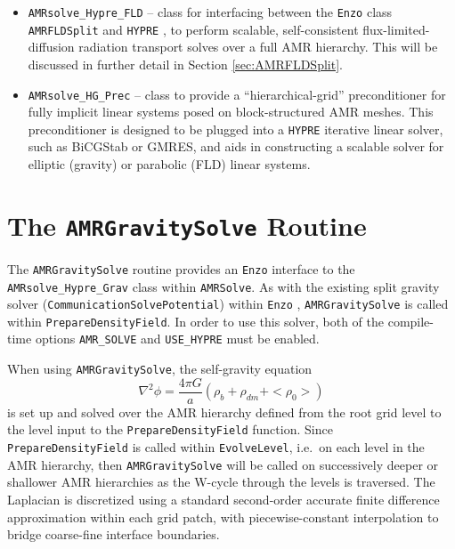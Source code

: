 \documentclass[letterpaper,10pt]{article}
\renewcommand{\(}{\left(}
\renewcommand{\)}{\right)}
\newcommand{\enzo}{{\tt Enzo} }
\newcommand{\hypre}{{\tt HYPRE} }
\begin{document}
\begin{itemize}
  \enzo routine {\tt AMRGravitySolve} and \hypre, to perform scalable,
  self-consistent self-gravity solves over a full AMR hierarchy.  This
  will be discussed in further detail in Section
  \ref{sec:AMRGravitySolve}.
\item {\tt AMRsolve\_Hypre\_FLD} -- class for interfacing between the
  \enzo class {\tt AMRFLDSplit} and \hypre, to perform scalable,
  self-consistent flux-limited-diffusion radiation transport solves
  over a full AMR hierarchy.  This will be discussed in further detail
  in Section \ref{sec:AMRFLDSplit}.
\item {\tt AMRsolve\_HG\_Prec} -- class to provide a
  ``hierarchical-grid'' preconditioner for fully implicit linear
  systems posed on block-structured AMR meshes.  This preconditioner
  is designed to be plugged into a \hypre iterative linear solver,
  such as BiCGStab or GMRES, and aids in constructing a scalable
  solver for elliptic (gravity) or parabolic (FLD) linear systems.
\end{itemize}



\section{The {\tt AMRGravitySolve} Routine}
\label{sec:AMRGravitySolve}

The {\tt AMRGravitySolve} routine provides an \enzo interface to the
{\tt AMRsolve\_Hypre\_Grav} class within {\tt AMRSolve}.  As with the
existing split gravity solver ({\tt CommunicationSolvePotential})
within \enzo, {\tt AMRGravitySolve} is called within 
{\tt PrepareDensityField}.  In order to use this solver, both of the
compile-time options {\tt AMR\_SOLVE} and {\tt USE\_HYPRE} must be
enabled.

When using {\tt AMRGravitySolve}, the self-gravity equation
\begin{equation}
\label{eq:self_gravity}
  \nabla^2 \phi = \frac{4\pi G}{a}(\rho_b + \rho_{dm} + <\!\!\rho_0\!\!>)
\end{equation}
is set up and solved over the AMR hierarchy defined from the root grid
level to the level input to the {\tt PrepareDensityField} function.
Since {\tt PrepareDensityField} is called within {\tt EvolveLevel},
i.e.~on each level in the AMR hierarchy, then {\tt AMRGravitySolve}
will be called on successively deeper or shallower AMR hierarchies as
the W-cycle through the levels is traversed.  The Laplacian is
discretized using a standard second-order accurate finite difference
approximation within each grid patch, with piecewise-constant
interpolation to bridge coarse-fine interface boundaries.
\end{document}
